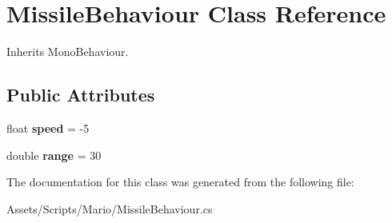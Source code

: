 \hypertarget{class_missile_behaviour}{\section{Missile\-Behaviour Class Reference}
\label{class_missile_behaviour}
}


Inherits Mono\-Behaviour.

\subsection*{Public Attributes}
\begin{DoxyCompactItemize}
\item 
\hypertarget{class_missile_behaviour_afd831083ad072d9e0024c5285524e19f}{float {\bfseries speed} = -\/5}\label{class_missile_behaviour_afd831083ad072d9e0024c5285524e19f}

\item 
\hypertarget{class_missile_behaviour_aba80cda52b72077a70ba8ea65036324c}{double {\bfseries range} = 30}\label{class_missile_behaviour_aba80cda52b72077a70ba8ea65036324c}

\end{DoxyCompactItemize}


The documentation for this class was generated from the following file\-:\begin{DoxyCompactItemize}
\item 
Assets/\-Scripts/\-Mario/Missile\-Behaviour.\-cs\end{DoxyCompactItemize}
